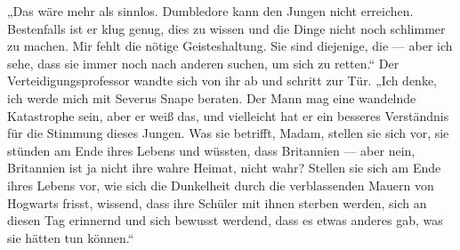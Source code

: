 „Das wäre mehr als sinnlos. Dumbledore kann den Jungen nicht erreichen. Bestenfalls ist er klug genug, dies zu wissen und die Dinge nicht noch schlimmer zu machen. Mir fehlt die nötige Geisteshaltung. Sie sind diejenige, die — aber ich sehe, dass sie immer noch nach anderen suchen, um sich zu retten.“ Der Verteidigungsprofessor wandte sich von ihr ab und schritt zur Tür.
„Ich denke, ich werde mich mit Severus Snape beraten. Der Mann mag eine wandelnde Katastrophe sein, aber er weiß das, und vielleicht hat er ein besseres Verständnis für die Stimmung dieses Jungen. Was sie betrifft, Madam, stellen sie sich vor, sie stünden am Ende ihres Lebens und wüssten, dass Britannien — aber nein, Britannien ist ja nicht ihre wahre Heimat, nicht wahr? Stellen sie sich am Ende ihres Lebens vor, wie sich die Dunkelheit durch die verblassenden Mauern von Hogwarts frisst, wissend, dass ihre Schüler mit ihnen sterben werden, sich an diesen Tag erinnernd und sich bewusst werdend, dass es etwas anderes gab, was sie hätten tun können.“


